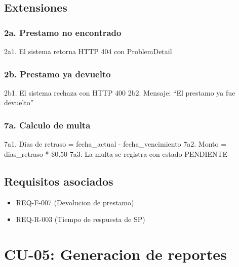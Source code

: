 \documentclass[
11pt,
a4paper,
]{report}
\providecommand{\tightlist}{%
	\setlength{\itemsep}{0pt}\setlength{\parskip}{0pt}}
\begin{document}
	\hypertarget{extensiones-3}{%
		\subsection{Extensiones}\label{extensiones-3}}
	
	\hypertarget{a.-prestamo-no-encontrado}{%
		\subsubsection{2a. Prestamo no encontrado}\label{a.-prestamo-no-encontrado}}
	
	2a1. El sistema retorna HTTP 404 con ProblemDetail
	
	\hypertarget{b.-prestamo-ya-devuelto}{%
		\subsubsection{2b. Prestamo ya devuelto}\label{b.-prestamo-ya-devuelto}}
	
	2b1. El sistema rechaza con HTTP 400
	2b2. Mensaje: ``El prestamo ya fue devuelto''
	
	\hypertarget{a.-calculo-de-multa}{%
		\subsubsection{7a. Calculo de multa}\label{a.-calculo-de-multa}}
	
	7a1. Dias de retraso = fecha\_actual - fecha\_vencimiento
	7a2. Monto = dias\_retraso * \$0.50
	7a3. La multa se registra con estado PENDIENTE
	
	\hypertarget{requisitos-asociados-3}{%
		\subsection{Requisitos asociados}\label{requisitos-asociados-3}}
	
	\begin{itemize}
		\tightlist
		\item
		REQ-F-007 (Devolucion de prestamo)
		\item
		REQ-R-003 (Tiempo de respuesta de SP)
	\end{itemize}
	
	\hypertarget{cu-05-generacion-de-reportes}{%
		\section{CU-05: Generacion de reportes}\label{cu-05-generacion-de-reportes}}
	
\end{document}
